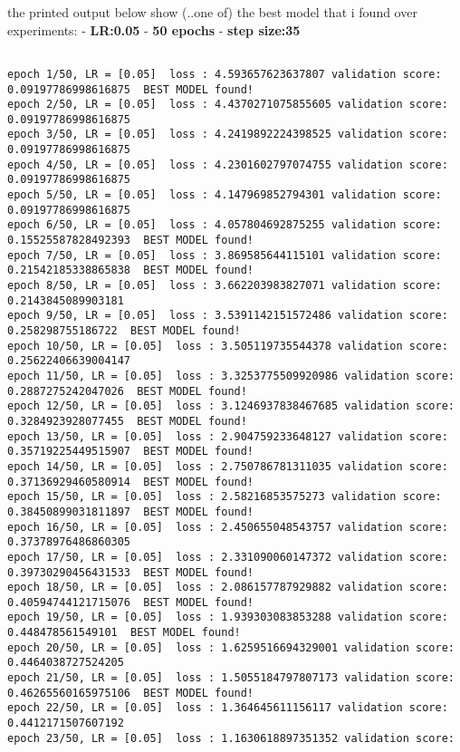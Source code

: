 \documentclass[11pt]{article}
\begin{document}
the printed output below show (..one of) the best model that i found
over experiments: - \textbf{LR:0.05} - \textbf{50 epochs} - \textbf{step
size:35}

    \begin{Verbatim}[commandchars=\\\{\}]

epoch 1/50, LR = [0.05]  loss : 4.593657623637807 validation score:
0.09197786998616875  BEST MODEL found!
epoch 2/50, LR = [0.05]  loss : 4.4370271075855605 validation score:
0.09197786998616875
epoch 3/50, LR = [0.05]  loss : 4.2419892224398525 validation score:
0.09197786998616875
epoch 4/50, LR = [0.05]  loss : 4.2301602797074755 validation score:
0.09197786998616875
epoch 5/50, LR = [0.05]  loss : 4.147969852794301 validation score:
0.09197786998616875
epoch 6/50, LR = [0.05]  loss : 4.057804692875255 validation score:
0.15525587828492393  BEST MODEL found!
epoch 7/50, LR = [0.05]  loss : 3.869585644115101 validation score:
0.21542185338865838  BEST MODEL found!
epoch 8/50, LR = [0.05]  loss : 3.662203983827071 validation score:
0.2143845089903181
epoch 9/50, LR = [0.05]  loss : 3.5391142151572486 validation score:
0.258298755186722  BEST MODEL found!
epoch 10/50, LR = [0.05]  loss : 3.505119735544378 validation score:
0.25622406639004147
epoch 11/50, LR = [0.05]  loss : 3.3253775509920986 validation score:
0.2887275242047026  BEST MODEL found!
epoch 12/50, LR = [0.05]  loss : 3.1246937838467685 validation score:
0.3284923928077455  BEST MODEL found!
epoch 13/50, LR = [0.05]  loss : 2.904759233648127 validation score:
0.35719225449515907  BEST MODEL found!
epoch 14/50, LR = [0.05]  loss : 2.750786781311035 validation score:
0.37136929460580914  BEST MODEL found!
epoch 15/50, LR = [0.05]  loss : 2.58216853575273 validation score:
0.38450899031811897  BEST MODEL found!
epoch 16/50, LR = [0.05]  loss : 2.450655048543757 validation score:
0.37378976486860305
epoch 17/50, LR = [0.05]  loss : 2.331090060147372 validation score:
0.39730290456431533  BEST MODEL found!
epoch 18/50, LR = [0.05]  loss : 2.086157787929882 validation score:
0.40594744121715076  BEST MODEL found!
epoch 19/50, LR = [0.05]  loss : 1.939303083853288 validation score:
0.448478561549101  BEST MODEL found!
epoch 20/50, LR = [0.05]  loss : 1.6259516694329001 validation score:
0.4464038727524205
epoch 21/50, LR = [0.05]  loss : 1.5055184797807173 validation score:
0.46265560165975106  BEST MODEL found!
epoch 22/50, LR = [0.05]  loss : 1.364645611156117 validation score:
0.4412171507607192
epoch 23/50, LR = [0.05]  loss : 1.1630618897351352 validation score:

\end{Verbatim}
\end{document}
